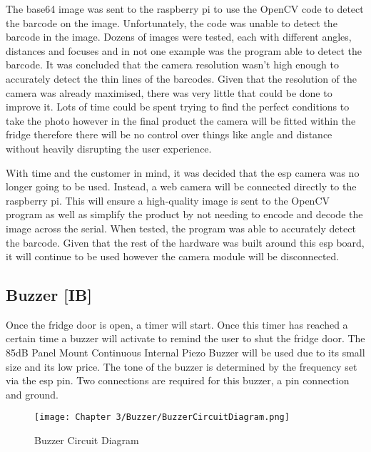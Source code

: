 The base64 image was sent to the raspberry pi to use the OpenCV code to detect the barcode on the image.
Unfortunately, the code was unable to detect the barcode in the image.
Dozens of images were tested, each with different angles, distances and focuses and in not one example was the program able to detect the barcode.
It was concluded that the camera resolution wasn't high enough to accurately detect the thin lines of the barcodes.
Given that the resolution of the camera was already maximised, there was very little that could be done to improve it.
Lots of time could be spent trying to find the perfect conditions to take the photo however in the final product the camera will be fitted within the fridge therefore there will be no control over things like angle and distance without heavily disrupting the user experience.

With time and the customer in mind, it was decided that the esp camera was no longer going to be used.
Instead, a web camera will be connected directly to the raspberry pi.
This will ensure a high-quality image is sent to the OpenCV program as well as simplify the product by not needing to encode and decode the image across the serial.
When tested, the program was able to accurately detect the barcode.
Given that the rest of the hardware was built around this esp board, it will continue to be used however the camera module will be disconnected.

\subsection{Buzzer [IB]}

Once the fridge door is open, a timer will start.
Once this timer has reached a certain time a buzzer will activate to remind the user to shut the fridge door.
The 85dB Panel Mount Continuous Internal Piezo Buzzer will be used due to its small size and its low price.
The tone of the buzzer is determined by the frequency set via the esp pin.
Two connections are required for this buzzer, a pin connection and ground.

\begin{figure}[H]        
    \centering
    \texttt{[image: Chapter 3/Buzzer/BuzzerCircuitDiagram.png]}
    \caption{Buzzer Circuit Diagram}
    \label{fig:buzzcircuit}
\end{figure} 

